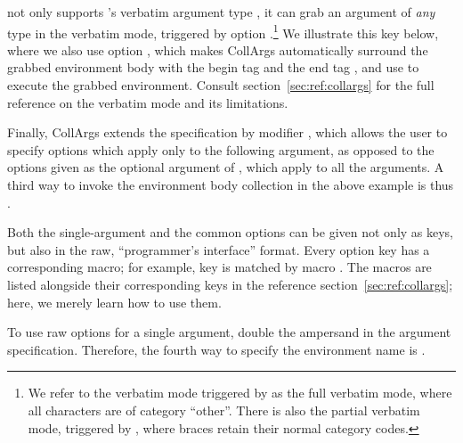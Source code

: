 \documentclass[a4paper,11pt]{article}
\begin{document}
 not only supports 's verbatim argument
type , it can grab an argument of \emph{any} type in the
verbatim mode, triggered by option .\footnote{We refer to
  the verbatim mode triggered by  as the full verbatim
  mode, where all characters are of category ``other''.  There is also the
  partial verbatim mode, triggered by , where braces retain
  their normal category codes.} We illustrate this key below, where we also use
option , which makes CollArgs automatically surround the
grabbed environment body with the begin tag  and the end tag , and use
 to execute the grabbed environment.  Consult
section~\ref{sec:ref:collargs} for the full reference on the verbatim mode and
its limitations.


Finally, CollArgs extends the  specification by modifier
, which allows the user to specify options which apply only
to the following argument, as opposed to the options given as the optional
argument of , which apply to all the arguments.  A
third way to invoke the environment body collection in the above example is
thus %
.

Both the single-argument and the common options can be given not only as
 keys, but also in the raw, ``programmer's interface'' format.
Every option key has a corresponding macro; for example, key
 is matched by macro .
The macros are listed alongside their corresponding keys in the reference
section~\ref{sec:ref:collargs}; here, we merely learn how to use them.

To use raw options for a single argument, double the ampersand in the argument
specification.  Therefore, the fourth way to specify the environment name is
.
\end{document}
